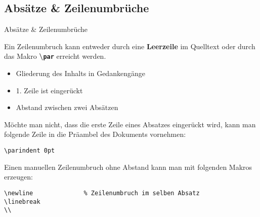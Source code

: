 \subsection{Absätze \& Zeilenumbrüche}
\begin{frame}[fragile]{Absätze \& Zeilenumbrüche}

Ein Zeilenumbruch kann entweder durch eine \textbf{Leerzeile} im Quelltext oder durch das Makro \textbf{\textbackslash\texttt{par}}  erreicht werden.

\begin{itemize}
	\item Gliederung des Inhalts in Gedankengänge
	\item 1. Zeile ist eingerückt
	\item Abstand zwischen zwei Absätzen
\end{itemize}


Möchte man nicht, dass die erste Zeile eines Absatzes eingerückt wird, kann man folgende Zeile in die Präambel des Dokuments vornehmen:
\begin{lstlisting}[style=tex]
\parindent 0pt
\end{lstlisting}

Einen manuellen Zeilenumbruch ohne Abstand kann man mit folgenden Makros erzeugen:
\begin{lstlisting}[style=tex]
\newline              % Zeilenumbruch im selben Absatz
\linebreak
\\
\end{lstlisting}

\end{frame}

